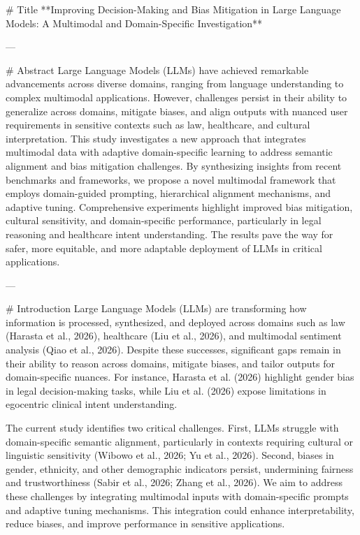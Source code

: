 # Title  
**Improving Decision-Making and Bias Mitigation in Large Language Models: A Multimodal and Domain-Specific Investigation**

---

# Abstract  
Large Language Models (LLMs) have achieved remarkable advancements across diverse domains, ranging from language understanding to complex multimodal applications. However, challenges persist in their ability to generalize across domains, mitigate biases, and align outputs with nuanced user requirements in sensitive contexts such as law, healthcare, and cultural interpretation. This study investigates a new approach that integrates multimodal data with adaptive domain-specific learning to address semantic alignment and bias mitigation challenges. By synthesizing insights from recent benchmarks and frameworks, we propose a novel multimodal framework that employs domain-guided prompting, hierarchical alignment mechanisms, and adaptive tuning. Comprehensive experiments highlight improved bias mitigation, cultural sensitivity, and domain-specific performance, particularly in legal reasoning and healthcare intent understanding. The results pave the way for safer, more equitable, and more adaptable deployment of LLMs in critical applications.

---

# Introduction  
Large Language Models (LLMs) are transforming how information is processed, synthesized, and deployed across domains such as law (Harasta et al., 2026), healthcare (Liu et al., 2026), and multimodal sentiment analysis (Qiao et al., 2026). Despite these successes, significant gaps remain in their ability to reason across domains, mitigate biases, and tailor outputs for domain-specific nuances. For instance, Harasta et al. (2026) highlight gender bias in legal decision-making tasks, while Liu et al. (2026) expose limitations in egocentric clinical intent understanding.

The current study identifies two critical challenges. First, LLMs struggle with domain-specific semantic alignment, particularly in contexts requiring cultural or linguistic sensitivity (Wibowo et al., 2026; Yu et al., 2026). Second, biases in gender, ethnicity, and other demographic indicators persist, undermining fairness and trustworthiness (Sabir et al., 2026; Zhang et al., 2026). We aim to address these challenges by integrating multimodal inputs with domain-specific prompts and adaptive tuning mechanisms. This integration could enhance interpretability, reduce biases, and improve performance in sensitive applications.


